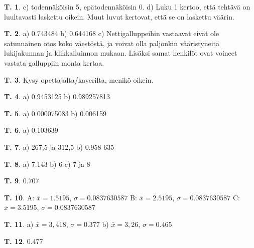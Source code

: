 \documentclass[12pt,leqno,a4paper,oneside]{amsart}
\theoremstyle{definition}
\newtheorem{exercise}{T.}
\theoremstyle{remark}
\numberwithin{equation}{section}
\begin{document}
\begin{exercise}
 c) todennäköisin 5, epätodennäköisin 0.
 d) Luku 1 kertoo, että tehtävä on luultavasti laskettu oikein. Muut luvut kertovat, että se on laskettu väärin.
\end{exercise}


\begin{exercise}
\label{kannatustehtava}
 a) 0.743484
 b) 0.644168
 c) Nettigalluppeihin vastaavat eivät ole satunnainen otos koko väestöstä, ja voivat olla paljonkin vääristyneitä lukijakunnan ja 
    klikkailuinnon mukaan. Lisäksi samat henkilöt ovat voineet vastata galluppiin monta kertaa.
\end{exercise}




\begin{exercise}
 Kysy opettajalta/kaverilta, menikö oikein.
\end{exercise}

\begin{exercise}
a) 0.9453125 b) 0.989257813
\end{exercise}

\begin{exercise}
a) 0.000075083 b) 0.006159
\end{exercise}

\begin{exercise}
 a) 0.103639
\end{exercise}

\begin{exercise}
a) 267,5 ja 312,5
b) 0.958 635
\end{exercise}

\begin{exercise}
 a) 7.143 b) 6 c) 7 ja 8
\end{exercise}

\begin{exercise}
 0.707
\end{exercise}

\begin{exercise}
 A: $\bar{x}=1.5195$, $\sigma=0.0837630587$ B: $\bar{x}=2.5195$, $\sigma=0.0837630587$ C: $\bar{x}=3.5195$, $\sigma=0.0837630587$
\end{exercise}

\begin{exercise}
 a) $\bar{x}=3,418$, $\sigma = 0.377$ b) $\bar{x}=3,26$, $\sigma = 0.465$
\end{exercise}

\begin{exercise}
 0.477
\end{exercise}
\end{document}
